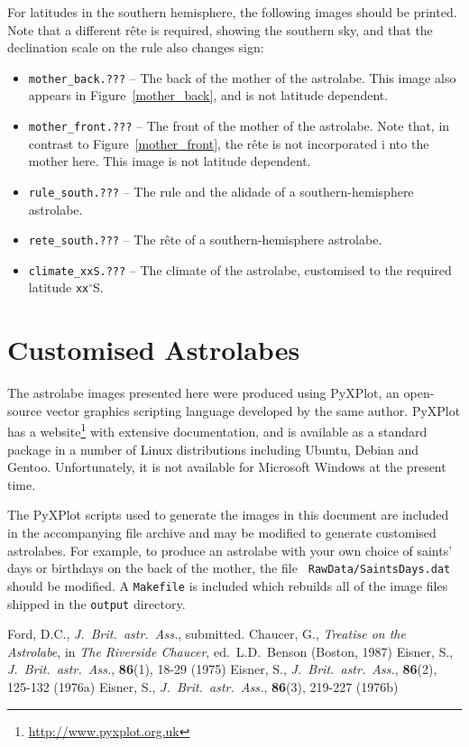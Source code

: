 \documentclass[a4paper,onecolumn,10pt]{article}
\begin{document}
For latitudes in the southern hemisphere, the following images should be
printed. Note that a different r\^ete is required, showing the southern sky,
and that the declination scale on the rule also changes sign:
\begin{itemize}
\item {\tt mother\_back.???} -- The back of the mother of the astrolabe. This image also appears in Figure~\ref{mother_back}, and is not latitude dependent.
\item {\tt mother\_front.???} -- The front of the mother of the astrolabe. Note
that, in contrast to Figure~\ref{mother_front}, the r\^ete is not incorporated i
nto the mother here. This image is not latitude dependent.
\item {\tt rule\_south.???} -- The rule and the alidade of a southern-hemisphere astrolabe.
\item {\tt rete\_south.???} -- The r\^ete of a southern-hemisphere astrolabe.
\item{\tt climate\_xxS.???} -- The climate of the astrolabe, customised to the required latitude {\tt xx}$^\circ$S.
\end{itemize}

\section*{Customised Astrolabes}

The astrolabe images presented here were produced using PyXPlot, an open-source
vector graphics scripting language developed by the same author.  PyXPlot has a
website\footnote{\url{http://www.pyxplot.org.uk}} with extensive documentation,
and is available as a standard package in a number of Linux distributions
including Ubuntu, Debian and Gentoo. Unfortunately, it is not available for
Microsoft Windows at the present time.

The PyXPlot scripts used to generate the images in this document are included
in the accompanying file archive and may be modified to generate customised
astrolabes. For example, to produce an astrolabe with your own choice of
saints' days or birthdays on the back of the mother, the file {\tt
Raw\-Data/\-Saints\-Days\-.dat} should be modified. A {\tt Makefile} is
included which rebuilds all of the image files shipped in the {\tt output}
directory.

\begin{thebibliography}{9}
Ford, D.C., \textit{J.\ Brit.\ astr.\ Ass.}, submitted.
Chaucer, G., \textit{Treatise on the Astrolabe}, in {\it The Riverside Chaucer}, ed.\ L.D.\ Benson (Boston, 1987)
Eisner, S., \textit{J.\ Brit.\ astr.\ Ass.}, \textbf{86}(1), 18-29 (1975)
Eisner, S., \textit{J.\ Brit.\ astr.\ Ass.}, \textbf{86}(2), 125-132 (1976a)
Eisner, S., \textit{J.\ Brit.\ astr.\ Ass.}, \textbf{86}(3), 219-227 (1976b)
\end{thebibliography}
\end{document}
